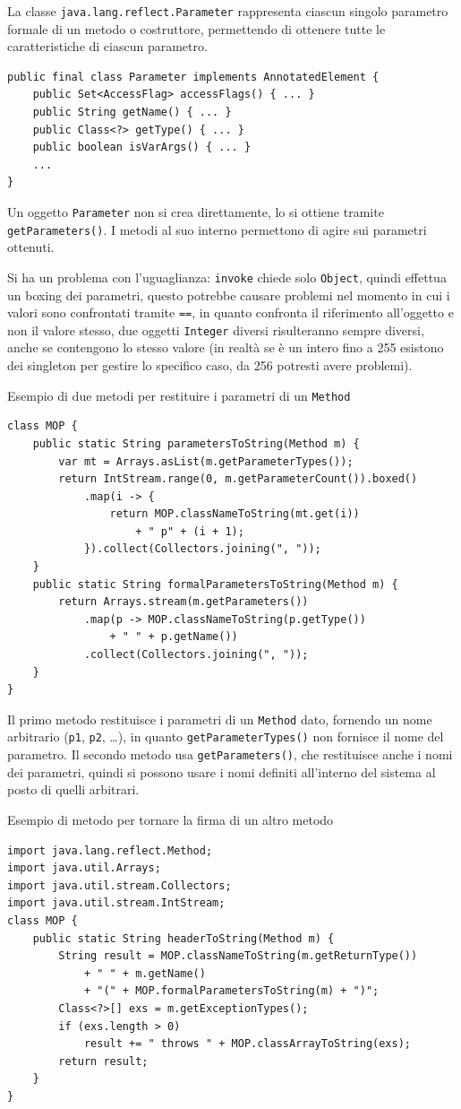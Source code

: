 La classe \texttt{java.lang.reflect.Parameter} rappresenta ciascun singolo parametro formale di un metodo o costruttore, permettendo di ottenere tutte le caratteristiche di ciascun parametro.
\begin{verbatim}
public final class Parameter implements AnnotatedElement {
    public Set<AccessFlag> accessFlags() { ... }
    public String getName() { ... }
    public Class<?> getType() { ... }
    public boolean isVarArgs() { ... }
    ...
}
\end{verbatim}
Un oggetto \texttt{Parameter} non si crea direttamente, lo si ottiene tramite \texttt{getParameters()}. I metodi al suo interno permettono di agire sui parametri ottenuti.

Si ha un problema con l'uguaglianza: \texttt{invoke} chiede solo \texttt{Object}, quindi effettua un boxing dei parametri, questo potrebbe causare problemi nel momento in cui i valori sono confrontati tramite \texttt{==}, in quanto confronta il riferimento all'oggetto e non il valore stesso, due oggetti \texttt{Integer} diversi risulteranno sempre diversi, anche se contengono lo stesso valore (in realtà se è un intero fino a 255 esistono dei singleton per gestire lo specifico caso, da 256 potresti avere problemi).

Esempio di due metodi per restituire i parametri di un \texttt{Method}
\begin{verbatim}
class MOP {
    public static String parametersToString(Method m) {
        var mt = Arrays.asList(m.getParameterTypes());
        return IntStream.range(0, m.getParameterCount()).boxed()
            .map(i -> {
                return MOP.classNameToString(mt.get(i))
                    + " p" + (i + 1);
            }).collect(Collectors.joining(", "));
    }
    public static String formalParametersToString(Method m) {
        return Arrays.stream(m.getParameters())
            .map(p -> MOP.classNameToString(p.getType())
                + " " + p.getName())
            .collect(Collectors.joining(", "));
    }
}
\end{verbatim}

Il primo metodo restituisce i parametri di un \texttt{Method} dato, fornendo un nome arbitrario (\texttt{p1}, \texttt{p2}, \dots), in quanto \texttt{getParameterTypes()} non fornisce il nome del parametro. Il secondo metodo usa \texttt{getParameters()}, che restituisce anche i nomi dei parametri, quindi si possono usare i nomi definiti all'interno del sistema al posto di quelli arbitrari.

Esempio di metodo per tornare la firma di un altro metodo
\begin{verbatim}
import java.lang.reflect.Method;
import java.util.Arrays;
import java.util.stream.Collectors;
import java.util.stream.IntStream;
class MOP {
    public static String headerToString(Method m) {
        String result = MOP.classNameToString(m.getReturnType())
            + " " + m.getName()
            + "(" + MOP.formalParametersToString(m) + ")";
        Class<?>[] exs = m.getExceptionTypes();
        if (exs.length > 0)
            result += " throws " + MOP.classArrayToString(exs);
        return result;
    }
}
\end{verbatim}

